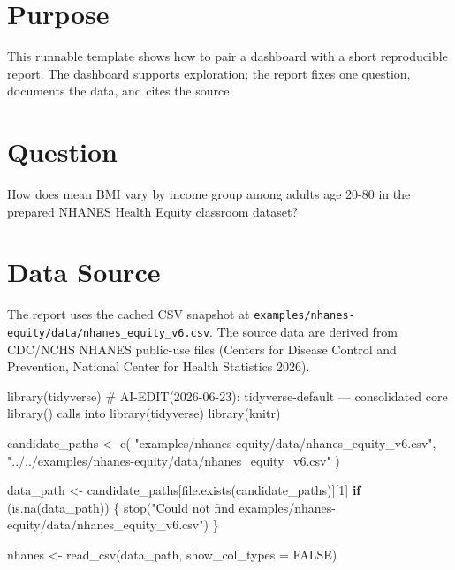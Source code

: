 \documentclass[
  letterpaper,
  DIV=11,
  numbers=noendperiod,
  oneside]{scrreprt}
\newenvironment{Shaded}{\begin{snugshade}}{\end{snugshade}}
\newcommand{\AttributeTok}[1]{\textcolor[rgb]{0.40,0.45,0.13}{#1}}
\newcommand{\CommentTok}[1]{\textcolor[rgb]{0.37,0.37,0.37}{#1}}
\newcommand{\ConstantTok}[1]{\textcolor[rgb]{0.56,0.35,0.01}{#1}}
\newcommand{\ControlFlowTok}[1]{\textcolor[rgb]{0.00,0.23,0.31}{\textbf{#1}}}
\newcommand{\DecValTok}[1]{\textcolor[rgb]{0.68,0.00,0.00}{#1}}
\newcommand{\FunctionTok}[1]{\textcolor[rgb]{0.28,0.35,0.67}{#1}}
\newcommand{\NormalTok}[1]{\textcolor[rgb]{0.00,0.23,0.31}{#1}}
\newcommand{\OtherTok}[1]{\textcolor[rgb]{0.00,0.23,0.31}{#1}}
\newcommand{\StringTok}[1]{\textcolor[rgb]{0.13,0.47,0.30}{#1}}
\begin{document}
\section*{Purpose}\label{purpose-2}


This runnable template shows how to pair a dashboard with a short
reproducible report. The dashboard supports exploration; the report
fixes one question, documents the data, and cites the source.

\section*{Question}\label{question-2}


How does mean BMI vary by income group among adults age 20-80 in the
prepared NHANES Health Equity classroom dataset?

\section*{Data Source}\label{data-source-1}


The report uses the cached CSV snapshot at
\texttt{examples/nhanes-equity/data/nhanes\_equity\_v6.csv}. The source
data are derived from CDC/NCHS NHANES public-use files (Centers for
Disease Control and Prevention, National Center for Health Statistics
2026).

\begin{Shaded}
\begin{Highlighting}[numbers=left,,]
\FunctionTok{library}\NormalTok{(tidyverse)  }\CommentTok{\# AI{-}EDIT(2026{-}06{-}23): tidyverse{-}default — consolidated core library() calls into library(tidyverse)}
\FunctionTok{library}\NormalTok{(knitr)}

\NormalTok{candidate\_paths }\OtherTok{\textless{}{-}} \FunctionTok{c}\NormalTok{(}
  \StringTok{"examples/nhanes{-}equity/data/nhanes\_equity\_v6.csv"}\NormalTok{,}
  \StringTok{"../../examples/nhanes{-}equity/data/nhanes\_equity\_v6.csv"}
\NormalTok{)}

\NormalTok{data\_path }\OtherTok{\textless{}{-}}\NormalTok{ candidate\_paths[}\FunctionTok{file.exists}\NormalTok{(candidate\_paths)][}\DecValTok{1}\NormalTok{]}
\ControlFlowTok{if}\NormalTok{ (}\FunctionTok{is.na}\NormalTok{(data\_path)) \{}
  \FunctionTok{stop}\NormalTok{(}\StringTok{"Could not find examples/nhanes{-}equity/data/nhanes\_equity\_v6.csv"}\NormalTok{)}
\NormalTok{\}}

\NormalTok{nhanes }\OtherTok{\textless{}{-}} \FunctionTok{read\_csv}\NormalTok{(data\_path, }\AttributeTok{show\_col\_types =} \ConstantTok{FALSE}\NormalTok{)}
\end{Highlighting}
\end{Shaded}
\end{document}
